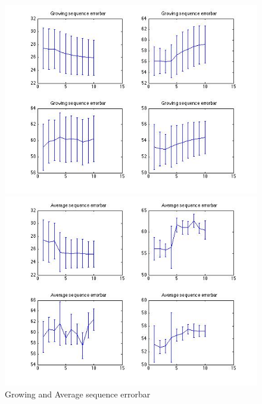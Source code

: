 \documentclass[10pt,conference]{IEEEtran}
\begin{document}
\begin{figure}[htbp]
\begin{minipage}[t]{0.5\textwidth}
	\centering
	\includegraphics[scale=0.5]{device1-1}
\end{minipage}
\begin{minipage}[t]{0.5\textwidth}
	\centering
	\includegraphics[scale=0.5]{device1-2}
\end{minipage}
\caption{Growing and Average sequence errorbar}\label{errorbar}
\end{figure}

\end{document}
